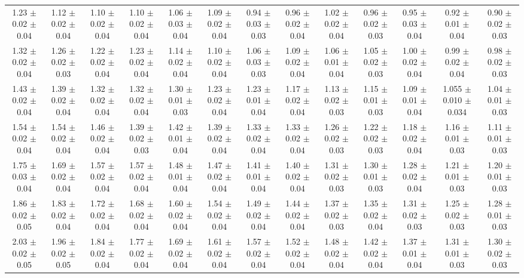 \begin{landscape}
{\begin{tabular}{  | c | c | c | c | c | c | c | c | c | c | c | c | c | }
1.23 $\pm$0.02 $\pm$0.04 & 1.12 $\pm$0.02 $\pm$0.04 & 1.10 $\pm$0.02 $\pm$0.04 & 1.10 $\pm$0.02 $\pm$0.04 & 1.06 $\pm$0.03 $\pm$0.04 & 1.09 $\pm$0.02 $\pm$0.04 & 0.94 $\pm$0.03 $\pm$0.03 & 0.96 $\pm$0.02 $\pm$0.04 & 1.02 $\pm$0.02 $\pm$0.04 & 0.96 $\pm$0.02 $\pm$0.03 & 0.95 $\pm$0.03 $\pm$0.04 & 0.92 $\pm$0.01 $\pm$0.04 & 0.90 $\pm$0.02 $\pm$0.03\\
1.32 $\pm$0.02 $\pm$0.04 & 1.26 $\pm$0.02 $\pm$0.03 & 1.22 $\pm$0.02 $\pm$0.04 & 1.23 $\pm$0.02 $\pm$0.04 & 1.14 $\pm$0.02 $\pm$0.04 & 1.10 $\pm$0.02 $\pm$0.04 & 1.06 $\pm$0.03 $\pm$0.03 & 1.09 $\pm$0.02 $\pm$0.04 & 1.06 $\pm$0.01 $\pm$0.04 & 1.05 $\pm$0.02 $\pm$0.03 & 1.00 $\pm$0.02 $\pm$0.04 & 0.99 $\pm$0.02 $\pm$0.04 & 0.98 $\pm$0.02 $\pm$0.03\\
1.43 $\pm$0.02 $\pm$0.04 & 1.39 $\pm$0.02 $\pm$0.04 & 1.32 $\pm$0.02 $\pm$0.04 & 1.32 $\pm$0.02 $\pm$0.04 & 1.30 $\pm$0.01 $\pm$0.03 & 1.23 $\pm$0.02 $\pm$0.04 & 1.23 $\pm$0.01 $\pm$0.04 & 1.17 $\pm$0.02 $\pm$0.04 & 1.13 $\pm$0.02 $\pm$0.03 & 1.15 $\pm$0.01 $\pm$0.03 & 1.09 $\pm$0.01 $\pm$0.04 & 1.055 $\pm$0.010 $\pm$0.034 & 1.04 $\pm$0.01 $\pm$0.03\\
1.54 $\pm$0.02 $\pm$0.04 & 1.54 $\pm$0.02 $\pm$0.04 & 1.46 $\pm$0.02 $\pm$0.04 & 1.39 $\pm$0.02 $\pm$0.03 & 1.42 $\pm$0.01 $\pm$0.04 & 1.39 $\pm$0.02 $\pm$0.04 & 1.33 $\pm$0.02 $\pm$0.04 & 1.33 $\pm$0.02 $\pm$0.04 & 1.26 $\pm$0.02 $\pm$0.03 & 1.22 $\pm$0.02 $\pm$0.03 & 1.18 $\pm$0.02 $\pm$0.04 & 1.16 $\pm$0.01 $\pm$0.03 & 1.11 $\pm$0.01 $\pm$0.03\\
1.75 $\pm$0.03 $\pm$0.04 & 1.69 $\pm$0.02 $\pm$0.04 & 1.57 $\pm$0.02 $\pm$0.04 & 1.57 $\pm$0.02 $\pm$0.04 & 1.48 $\pm$0.01 $\pm$0.04 & 1.47 $\pm$0.02 $\pm$0.04 & 1.41 $\pm$0.01 $\pm$0.04 & 1.40 $\pm$0.02 $\pm$0.04 & 1.31 $\pm$0.02 $\pm$0.03 & 1.30 $\pm$0.01 $\pm$0.03 & 1.28 $\pm$0.02 $\pm$0.04 & 1.21 $\pm$0.01 $\pm$0.03 & 1.20 $\pm$0.01 $\pm$0.03\\
1.86 $\pm$0.02 $\pm$0.05 & 1.83 $\pm$0.02 $\pm$0.04 & 1.72 $\pm$0.02 $\pm$0.04 & 1.68 $\pm$0.02 $\pm$0.04 & 1.60 $\pm$0.02 $\pm$0.04 & 1.54 $\pm$0.02 $\pm$0.04 & 1.49 $\pm$0.02 $\pm$0.04 & 1.44 $\pm$0.02 $\pm$0.04 & 1.37 $\pm$0.02 $\pm$0.03 & 1.35 $\pm$0.02 $\pm$0.04 & 1.31 $\pm$0.02 $\pm$0.03 & 1.25 $\pm$0.02 $\pm$0.03 & 1.28 $\pm$0.01 $\pm$0.03\\
2.03 $\pm$0.02 $\pm$0.05 & 1.96 $\pm$0.02 $\pm$0.05 & 1.84 $\pm$0.02 $\pm$0.04 & 1.77 $\pm$0.02 $\pm$0.04 & 1.69 $\pm$0.02 $\pm$0.04 & 1.61 $\pm$0.02 $\pm$0.04 & 1.57 $\pm$0.02 $\pm$0.04 & 1.52 $\pm$0.02 $\pm$0.04 & 1.48 $\pm$0.02 $\pm$0.04 & 1.42 $\pm$0.02 $\pm$0.04 & 1.37 $\pm$0.01 $\pm$0.04 & 1.31 $\pm$0.01 $\pm$0.03 & 1.30 $\pm$0.02 $\pm$0.03\\

\end{tabular}}
\end{landscape}
